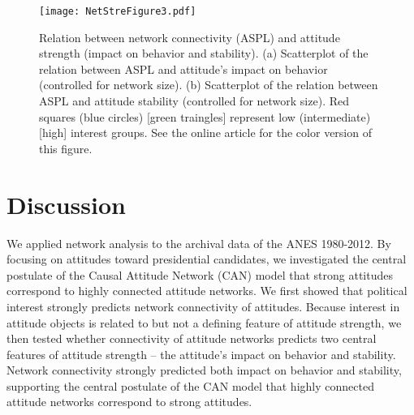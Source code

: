 \documentclass[10pt]{article}
\begin{document}
\begin{multicols}{2}
\begin{figure*}[]
    \centering
\texttt{[image: NetStreFigure3.pdf]}
\caption{Relation between network connectivity (ASPL) and attitude strength (impact on behavior and stability). (a) Scatterplot of the relation between ASPL and attitude's impact on behavior (controlled for network size). (b) Scatterplot of the relation between ASPL and attitude stability (controlled for network size). Red squares (blue circles) [green traingles] represent low (intermediate) [high] interest groups. See the online article for the color version of this figure.}
\label{fig:fig3}
\end{figure*}

\section*{Discussion}
We applied network analysis to the archival data of the ANES 1980-2012. By focusing on attitudes toward presidential candidates, we investigated the central postulate of the Causal Attitude Network (CAN) model that strong attitudes correspond to highly connected attitude networks. We first showed that political interest strongly predicts network connectivity of attitudes. Because interest in attitude objects is related to but not a defining feature of attitude strength, we then tested whether connectivity of attitude networks predicts two central features of attitude strength -- the attitude's impact on behavior and stability. Network connectivity strongly predicted both impact on behavior and stability, supporting the central postulate of the CAN model that highly connected attitude networks correspond to strong attitudes. 

\end{multicols}
\end{document}
